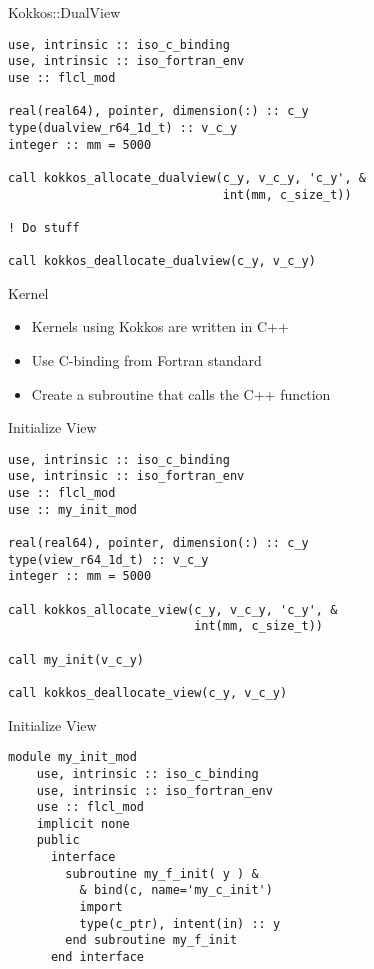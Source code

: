 \begin{frame}[containsverbatim]{Kokkos::DualView}
  \begin{verbatim}
use, intrinsic :: iso_c_binding
use, intrinsic :: iso_fortran_env
use :: flcl_mod

real(real64), pointer, dimension(:) :: c_y
type(dualview_r64_1d_t) :: v_c_y
integer :: mm = 5000

call kokkos_allocate_dualview(c_y, v_c_y, 'c_y', &
                              int(mm, c_size_t))

! Do stuff

call kokkos_deallocate_dualview(c_y, v_c_y)
  \end{verbatim}
\end{frame}

\begin{frame}{Kernel}
  \begin{itemize}
    \item Kernels using Kokkos are written in C++
    \item Use C-binding from Fortran standard 
    \item Create a subroutine that calls the C++ function
  \end{itemize}
\end{frame}

\begin{frame}[containsverbatim]{Initialize View}
  \begin{verbatim}
use, intrinsic :: iso_c_binding
use, intrinsic :: iso_fortran_env
use :: flcl_mod
use :: my_init_mod

real(real64), pointer, dimension(:) :: c_y
type(view_r64_1d_t) :: v_c_y
integer :: mm = 5000

call kokkos_allocate_view(c_y, v_c_y, 'c_y', &
                          int(mm, c_size_t))

call my_init(v_c_y)

call kokkos_deallocate_view(c_y, v_c_y)
  \end{verbatim}
\end{frame}

\begin{frame}[containsverbatim]{Initialize View}
  \begin{verbatim}
module my_init_mod
    use, intrinsic :: iso_c_binding
    use, intrinsic :: iso_fortran_env
    use :: flcl_mod
    implicit none
    public
      interface
        subroutine my_f_init( y ) &
          & bind(c, name='my_c_init')
          import
          type(c_ptr), intent(in) :: y
        end subroutine my_f_init
      end interface
  \end{verbatim}
\end{frame}

